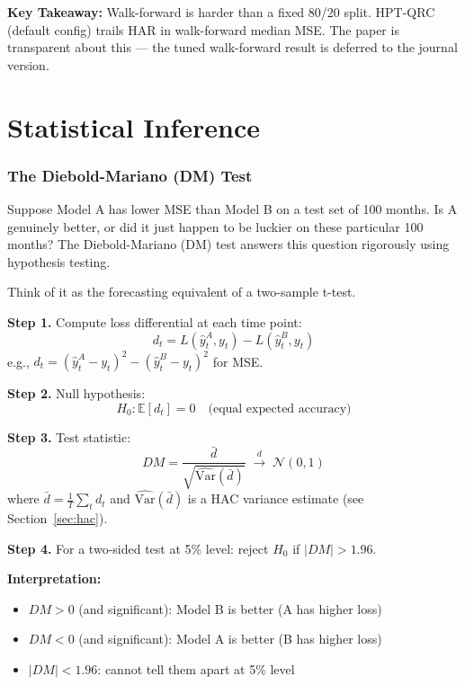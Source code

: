 \documentclass[11pt]{article}
\newcommand{\concept}[2]{%
  \begin{tcolorbox}[conceptbox, title={#1}]
  #2
  \end{tcolorbox}
}
\newcommand{\mathblock}[2]{%
  \begin{tcolorbox}[mathbox, title={Math: #1}]
  #2
  \end{tcolorbox}
}
\newcommand{\keypoint}[1]{%
  \begin{tcolorbox}[keybox]
  \textbf{Key Takeaway:} #1
  \end{tcolorbox}
}
\begin{document}
\keypoint{Walk-forward is harder than a fixed 80/20 split.
HPT-QRC (default config) trails HAR in walk-forward median MSE. The
paper is transparent about this --- the tuned walk-forward result
is deferred to the journal version.}

\clearpage
\part{Statistical Inference}

\section{The Diebold-Mariano (DM) Test}

\concept{Are Two Forecasters Really Different, or Just Lucky?}{
Suppose Model A has lower MSE than Model B on a test set of 100 months.
Is A genuinely better, or did it just happen to be luckier on these particular
100 months? The Diebold-Mariano (DM) test answers this question rigorously
using hypothesis testing.

Think of it as the forecasting equivalent of a two-sample t-test.
}

\mathblock{DM Test Step-by-Step}{
\textbf{Step 1.} Compute loss differential at each time point:
\[
  d_t = L(\hat y^A_t, y_t) - L(\hat y^B_t, y_t)
\]
e.g., $d_t = (\hat y^A_t - y_t)^2 - (\hat y^B_t - y_t)^2$ for MSE.

\textbf{Step 2.} Null hypothesis:
\[
  H_0: \mathbb{E}[d_t] = 0 \quad \text{(equal expected accuracy)}
\]

\textbf{Step 3.} Test statistic:
\[
  DM = \frac{\bar d}{\sqrt{\widehat{\mathrm{Var}}(\bar d)}}
     \;\xrightarrow{d}\; \mathcal{N}(0,1)
\]
where $\bar d = \frac{1}{T}\sum_t d_t$ and $\widehat{\mathrm{Var}}(\bar d)$
is a HAC variance estimate (see Section~\ref{sec:hac}).

\textbf{Step 4.} For a two-sided test at 5\% level:
reject $H_0$ if $|DM| > 1.96$.

\textbf{Interpretation:}
\begin{itemize}
  \item $DM > 0$ (and significant): Model B is better (A has higher loss)
  \item $DM < 0$ (and significant): Model A is better (B has higher loss)
  \item $|DM| < 1.96$: cannot tell them apart at 5\% level
\end{itemize}
}
\end{document}
